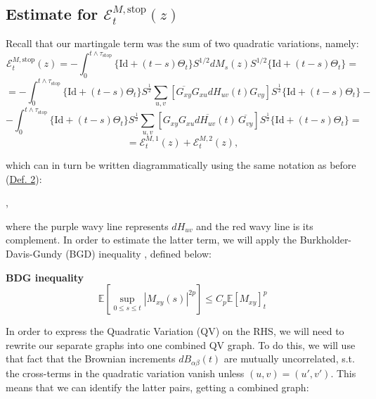 \documentclass[11pt]{article}
\newenvironment{boxtheorem}[1]
  {\begin{mdframed}\noindent\textbf{#1}\itshape\space}
  {\end{mdframed}}
\newcommand{\E}{\mathcal{E}}
\newcommand{\sto}{\text{stop}}
\begin{document}
\subsection{Estimate for $\E_t^{M, \text{stop}}(z)$}
Recall that our martingale term was the sum of two quadratic variations, namely:
$$\E_t^{M, \text{stop}}(z)=-\int_0^{t\wedge \tau_\sto} \{\text{Id} + (t-s)\Theta_t\} S^{1/2}dM_s(z)S^{1/2} \{\text{Id} + (t-s)\Theta_t\}= $$$$=-\int_0^{t\wedge \tau_\sto} \{\text{Id} + (t-s)\Theta_t\}S^{\frac{1}{2}}\sum_{u, v}\left[\overline{G_{xy}}G_{xu}dH_{uv}(t)G_{vy}\right]S^{\frac{1}{2}}\{\text{Id} + (t-s)\Theta_t\}-$$
$$- \int_0^{t\wedge \tau_\sto} \{\text{Id} + (t-s)\Theta_t\}S^{\frac{1}{2}}\sum_{u, v}\left[G_{xy}\overline{G_{xu}dH_{uv}(t)}\,\overline{G_{vy}}\right]S^{\frac{1}{2}}\{\text{Id} + (t-s)\Theta_t\}=$$
$$=\E_t^{M, 1}(z)+\E_t^{M, 2}(z),$$

\noindent which can in turn be written diagrammatically using the same notation as before (\hyperref[def2]{Def. 2}):
\begin{center}
 ,
\end{center}
where the purple wavy line represents $dH_{uv}$ and the red wavy line is its complement. In order to estimate the latter term, we will apply the Burkholder-Davis-Gundy (BGD) inequality \cite{bdg}, defined below:
\begin{boxtheorem}{\centering BDG inequality}
$$\mathbb{E}\left[\sup_{0\leq s\leq t}\left\vert M_{xy}(s)\right\vert^{2p}\right]\leq C_p\mathbb{E}\left[ M_{xy} \right]_t^p$$
\end{boxtheorem}
In order to express the Quadratic Variation (QV) on the RHS, we will need to rewrite our separate graphs into one combined QV graph. To do this, we will use that fact that the Brownian increments $dB_{\alpha\beta}(t)$ are mutually uncorrelated, s.t. the cross-terms in the quadratic variation vanish unless $(u, v) = (u', v')$. This means that we can identify the latter pairs, getting a combined graph:
\end{document}
